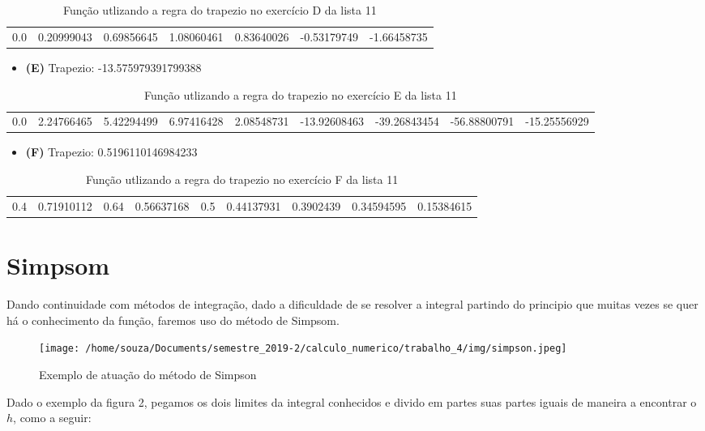 \documentclass[12pt]{article}
\begin{document}
\begin{table}[ht]
\centering
\begin{tabular}{|lllllll|}
  0.0 & 0.20999043 & 0.69856645 & 1.08060461 & 0.83640026 & -0.53179749 & -1.66458735
\end{tabular}
    \caption{Função utlizando a regra do trapezio no exercício D da lista 11}
\end{table}


\begin{itemize}
    \item \textbf{(E)} Trapezio: -13.575979391799388
\end{itemize}
\begin{table}[ht]
\centering
\begin{tabular}{|lllllllll|}
0.0 & 2.24766465 & 5.42294499 & 6.97416428 & 2.08548731 & -13.92608463 & -39.26843454 & -56.88800791 & -15.25556929
\end{tabular}
    \caption{Função utlizando a regra do trapezio no exercício E da lista 11}
\end{table}


\begin{itemize}
    \item \textbf{(F)} Trapezio: 0.5196110146984233
\end{itemize}
\begin{table}[ht]
\centering
\begin{tabular}{|lllllllll|}
  0.4  & 0.71910112  & 0.64 & 0.56637168 & 0.5 & 0.44137931 & 0.3902439 & 0.34594595 & 0.15384615
\end{tabular}
    \caption{Função utlizando a regra do trapezio no exercício F da lista 11}
\end{table}


\section{Simpsom}

Dando continuidade com métodos de integração, dado a dificuldade de se resolver a integral partindo do principio que muitas vezes se quer há o conhecimento da função, faremos uso do método de Simpsom.

\begin{figure}[!h]
    \centering
    \texttt{[image: /home/souza/Documents/semestre\_2019-2/calculo\_numerico/trabalho\_4/img/simpson.jpeg]}
    \caption{Exemplo de atuação do método de Simpson}
\end{figure}


Dado o exemplo da figura 2, pegamos os dois limites da integral conhecidos e divido em partes suas partes iguais de maneira a encontrar o $h$, como a seguir:
\end{document}
